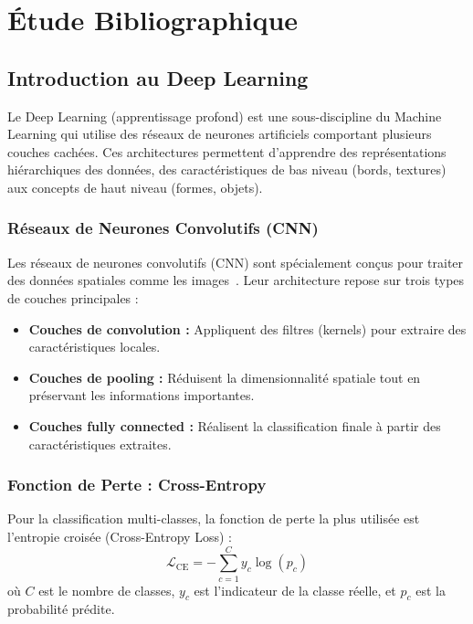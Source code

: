 \documentclass[12pt,a4paper]{report}
\begin{document}
\chapter{Étude Bibliographique}

\section{Introduction au Deep Learning}
Le Deep Learning (apprentissage profond) est une sous-discipline du Machine Learning qui utilise des réseaux de neurones artificiels comportant plusieurs couches cachées. Ces architectures permettent d'apprendre des représentations hiérarchiques des données, des caractéristiques de bas niveau (bords, textures) aux concepts de haut niveau (formes, objets).

\subsection{Réseaux de Neurones Convolutifs (CNN)}
Les réseaux de neurones convolutifs (CNN) sont spécialement conçus pour traiter des données spatiales comme les images~\cite{lecun1998}. Leur architecture repose sur trois types de couches principales :
\begin{itemize}
    \item \textbf{Couches de convolution :} Appliquent des filtres (kernels) pour extraire des caractéristiques locales.
    \item \textbf{Couches de pooling :} Réduisent la dimensionnalité spatiale tout en préservant les informations importantes.
    \item \textbf{Couches fully connected :} Réalisent la classification finale à partir des caractéristiques extraites.
\end{itemize}

\subsection{Fonction de Perte : Cross-Entropy}
Pour la classification multi-classes, la fonction de perte la plus utilisée est l'entropie croisée (Cross-Entropy Loss) :
\begin{equation}
    \mathcal{L}_{\text{CE}} = -\sum_{c=1}^{C} y_c \log(p_c)
\end{equation}
où $C$ est le nombre de classes, $y_c$ est l'indicateur de la classe réelle, et $p_c$ est la probabilité prédite.
\end{document}
